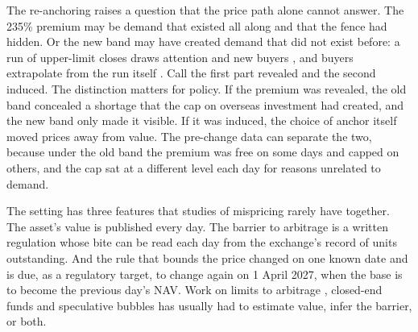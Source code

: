 \documentclass[10pt,journal,a4paper]{IEEEtran}
\theoremstyle{definition}
\begin{document}
The re-anchoring raises a question that the price path alone cannot answer. The 235\% premium may be demand that existed all along and that the fence had hidden. Or the new band may have created demand that did not exist before: a run of upper-limit closes draws attention and new buyers \citep{seasholes2007predictable}, and buyers extrapolate from the run itself \citep{barberis2018extrapolation,pearson2021chinese}. Call the first part revealed and the second induced. The distinction matters for policy. If the premium was revealed, the old band concealed a shortage that the cap on overseas investment had created, and the new band only made it visible. If it was induced, the choice of anchor itself moved prices away from value. The pre-change data can separate the two, because under the old band the premium was free on some days and capped on others, and the cap sat at a different level each day for reasons unrelated to demand.

The setting has three features that studies of mispricing rarely have together. The asset's value is published every day. The barrier to arbitrage is a written regulation whose bite can be read each day from the exchange's record of units outstanding. And the rule that bounds the price changed on one known date and is due, as a regulatory target, to change again on 1 April 2027, when the base is to become the previous day's NAV. Work on limits to arbitrage \citep{shleifer1997limits}, closed-end funds \citep{lee1991investor} and speculative bubbles \citep{xiong2011chinese} has usually had to estimate value, infer the barrier, or both.
\end{document}
